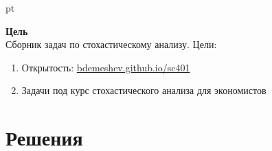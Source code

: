 \documentclass[12pt, a4paper]{article}
\numberwithin{problem}{section}
\begin{document}
 pt %

\textbf{Цель} \\
Сборник задач по стохастическому анализу. Цели:
\begin{enumerate}
\item Открытость: \url{bdemeshev.github.io/sc401}
\item Задачи под курс стохастического анализа для экономистов
\end{enumerate}

\tableofcontents



\section{Решения}




%

\printbibliography

\printindex %
\end{document}
